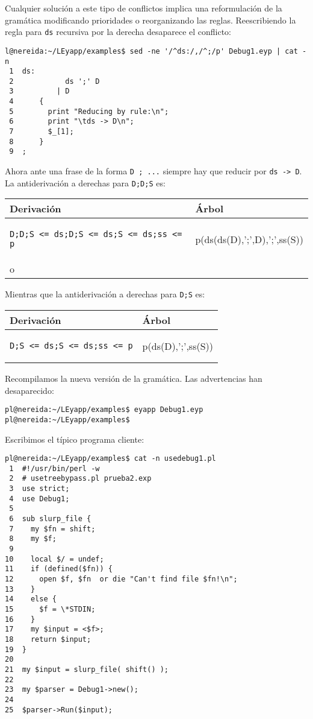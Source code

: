 Cualquier solución  a este tipo de conflictos
implica una reformulación de la gramática
modificando prioridades o reorganizando las reglas.
Reescribiendo la regla para \verb|ds| recursiva por la derecha
desaparece el conflicto:
\begin{verbatim}
l@nereida:~/LEyapp/examples$ sed -ne '/^ds:/,/^;/p' Debug1.eyp | cat -n
 1  ds:
 2            ds ';' D
 3          | D
 4      {
 5        print "Reducing by rule:\n";
 6        print "\tds -> D\n";
 7        $_[1];
 8      }
 9  ;
\end{verbatim}

Ahora ante una frase de la forma \verb|D ; ...| siempre hay que
reducir por \verb|ds -> D|. 
La antiderivación a derechas para \verb|D;D;S| es:

\begin{tabular}{|p{7cm}|p{5cm}|}
\hline
Derivación & Árbol\\
\hline
\begin{verbatim}
D;D;S <= ds;D;S <= ds;S <= ds;ss <= p
\end{verbatim}
&
p(ds(ds(D),';',D),';',ss(S))
\\
\hline
o\end{tabular}
Mientras que la antiderivación a derechas para \verb|D;S| es:

\begin{tabular}{|p{7cm}|p{5cm}|}
\hline
Derivación & Árbol\\
\hline
\begin{verbatim}
D;S <= ds;S <= ds;ss <= p
\end{verbatim}
&
p(ds(D),';',ss(S))
\\
\hline
\end{tabular}

Recompilamos la nueva versión de la gramática. 
Las advertencias han desaparecido:
\begin{verbatim}
pl@nereida:~/LEyapp/examples$ eyapp Debug1.eyp
pl@nereida:~/LEyapp/examples$ 
\end{verbatim}

\label{section:depuracion}

Escribimos el típico programa cliente:

\begin{verbatim}
pl@nereida:~/LEyapp/examples$ cat -n usedebug1.pl
 1  #!/usr/bin/perl -w
 2  # usetreebypass.pl prueba2.exp
 3  use strict;
 4  use Debug1;
 5
 6  sub slurp_file {
 7    my $fn = shift;
 8    my $f;
 9
10    local $/ = undef;
11    if (defined($fn)) {
12      open $f, $fn  or die "Can't find file $fn!\n";
13    }
14    else {
15      $f = \*STDIN;
16    }
17    my $input = <$f>;
18    return $input;
19  }
20
21  my $input = slurp_file( shift() );
22
23  my $parser = Debug1->new();
24
25  $parser->Run($input);
\end{verbatim}

